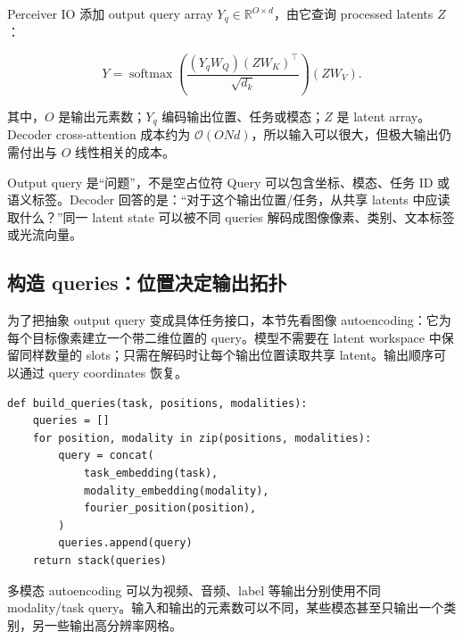 Perceiver IO 添加 output query array $Y_q\in\mathbb{R}^{O\times d}$，由它查询 processed latents $Z$：

\[
Y=\operatorname{softmax}\!\left(\frac{(Y_qW_Q)(ZW_K)^\top}{\sqrt{d_k}}\right)(ZW_V).
\]

其中，$O$ 是输出元素数；$Y_q$ 编码输出位置、任务或模态；$Z$ 是 latent array。Decoder cross-attention 成本约为 $\mathcal{O}(ONd)$，所以输入可以很大，但极大输出仍需付出与 $O$ 线性相关的成本。


\begin{importantbox}{Output query 是“问题”，不是空占位符}
Query 可以包含坐标、模态、任务 ID 或语义标签。Decoder 回答的是：“对于这个输出位置/任务，从共享 latents 中应读取什么？”同一 latent state 可以被不同 queries 解码成图像像素、类别、文本标签或光流向量。
\end{importantbox}

\subsection{构造 queries：位置决定输出拓扑}

为了把抽象 output query 变成具体任务接口，本节先看图像 autoencoding：它为每个目标像素建立一个带二维位置的 query。模型不需要在 latent workspace 中保留同样数量的 slots；只需在解码时让每个输出位置读取共享 latent。输出顺序可以通过 query coordinates 恢复。


\begin{lstlisting}[caption={任务化 output-query 构造的概念性伪代码。}]
def build_queries(task, positions, modalities):
    queries = []
    for position, modality in zip(positions, modalities):
        query = concat(
            task_embedding(task),
            modality_embedding(modality),
            fourier_position(position),
        )
        queries.append(query)
    return stack(queries)
\end{lstlisting}

多模态 autoencoding 可以为视频、音频、label 等输出分别使用不同 modality/task query。输入和输出的元素数可以不同，某些模态甚至只输出一个类别，另一些输出高分辨率网格。

